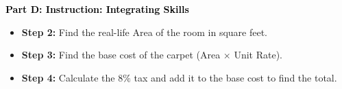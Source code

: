 \documentclass[12pt, letterpaper, fleqn]{article}
\newcommand{\blanklong}{\underline{\hspace{6.5cm}}}
\begin{document}
\newpage

\begin{tcolorbox}[colback=customteal!20]
\large\textcolor{black}{\textbf{Part D: Instruction: Integrating Skills}}
\end{tcolorbox}

\vspace{3mm}

\begin{enumerate}[itemsep=2.2cm, leftmargin=0.6cm, resume]
\begin{itemize}
\item \textbf{Step 2:} Find the real-life Area of the room in square feet. \blanklong
\item \textbf{Step 3:} Find the base cost of the carpet (Area $\times$ Unit Rate). \blanklong
\item \textbf{Step 4:} Calculate the $8\%$ tax and add it to the base cost to find the total. \blanklong
\end{itemize}
\end{enumerate}
\end{document}

